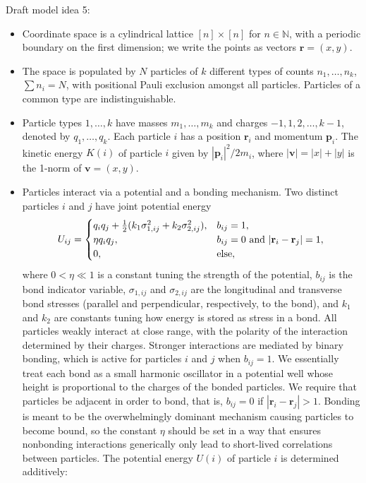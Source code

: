 \documentclass[12pt,letterpaper]{article}
\newcommand{\mb}{\mathbf}
\begin{document}
Draft model idea 5:
\begin{itemize}
\item Coordinate space is a cylindrical lattice $[n] \times [n]$ for $n \in \mathbb{N}$, with a periodic boundary on the first dimension; we write the points as vectors $\mb{r} = (x, y)$.
\item The space is populated by $N$ particles of $k$ different types of counts $n_{1}, \ldots, n_{k}$, $\sum n_{i} = N$, with positional Pauli exclusion amongst all particles. Particles of a common type are indistinguishable.
\item Particle types $1, \ldots, k$ have masses $m_{1}, \ldots, m_{k}$ and charges $-1, 1, 2, \ldots, k-1$, denoted by $q_{1}, \ldots, q_{k}$. Each particle $i$ has a position $\mb{r}_{i}$ and momentum $\mb{p}_{i}$. The kinetic energy $K(i)$ of particle $i$ given by $|\mb{p}_{i}|^{2}/2m_{i}$, where $|\mb{v}| = |x| + |y|$ is the 1-norm of $\mb{v} = (x, y)$.
\item Particles interact via a potential and a bonding mechanism. Two distinct particles $i$ and $j$ have joint potential energy
\begin{align*}
U_{ij} = \begin{cases}
q_{i}q_{j} + {1 \over 2}(k_{1}\sigma_{1,ij}^{2} + k_{2}\sigma_{2,ij}^{2}), &b_{ij} = 1, \\
\eta q_{i}q_{j}, &b_{ij} = 0 \textrm{ and } |\mb{r}_{i} - \mb{r}_{j}| = 1, \\
0, &\textrm{else},
\end{cases}
\end{align*}
where $0 < \eta \ll 1$ is a constant tuning the strength of the potential, $b_{ij}$ is the bond indicator variable, $\sigma_{1,ij}$ and $\sigma_{2,ij}$ are the longitudinal and transverse bond stresses (parallel and perpendicular, respectively, to the bond), and $k_{1}$ and $k_{2}$ are constants tuning how energy is stored as stress in a bond. All particles weakly interact at close range, with the polarity of the interaction determined by their charges. Stronger interactions are mediated by binary bonding, which is active for particles $i$ and $j$ when $b_{ij} = 1$. We essentially treat each bond as a small harmonic oscillator in a potential well whose height is proportional to the charges of the bonded particles. We require that particles be adjacent in order to bond, that is, $b_{ij} = 0$ if $|\mb{r}_{i} - \mb{r}_{j}| > 1$. Bonding is meant to be the overwhelmingly dominant mechanism causing particles to become bound, so the constant $\eta$ should be set in a way that ensures nonbonding interactions generically only lead to short-lived correlations between particles. The potential energy $U(i)$ of particle $i$ is determined additively:

\end{itemize}
\end{document}

